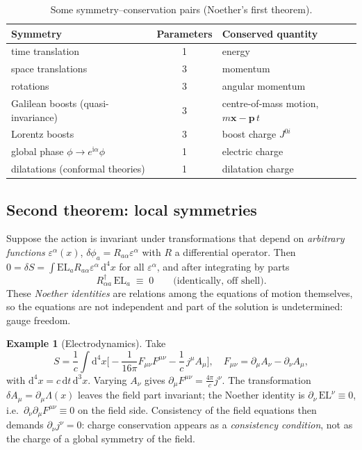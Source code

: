 \documentclass[11pt,a4paper,openany]{book}
\theoremstyle{definition}
\newtheorem{example}{Example}[chapter]
\theoremstyle{plain}
\theoremstyle{remark}
\newcommand{\dd}{\mathrm{d}}
\newcommand{\ii}{\mathrm{i}}
\newcommand{\eps}{\varepsilon}
\newcommand{\vx}{\bm{x}}
\newcommand{\vp}{\bm{p}}
\begin{document}
\begin{table}[ht]
\centering
\small
\renewcommand{\arraystretch}{1.2}
\begin{tabular}{@{}lcl@{}}
\toprule
Symmetry & Parameters & Conserved quantity\\
\midrule
time translation & 1 & energy\\
space translations & 3 & momentum\\
rotations & 3 & angular momentum\\
Galilean boosts (quasi-invariance) & 3 & centre-of-mass motion, $m\vx-\vp\,t$\\
Lorentz boosts & 3 & boost charge $J^{0i}$\\
global phase $\phi\to e^{\ii\alpha}\phi$ & 1 & electric charge\\
dilatations (conformal theories) & 1 & dilatation charge\\
\bottomrule
\end{tabular}
\caption{Some symmetry--conservation pairs (Noether's first theorem).}
\label{tab:noether}
\end{table}

\subsection{Second theorem: local symmetries}

Suppose the action is invariant under transformations that depend on
\emph{arbitrary functions} $\eps^\alpha(x)$,
$\delta\phi_a=R_{a\alpha}\eps^\alpha$ with $R$ a differential operator. Then
$0=\delta S=\int \mathrm{EL}_a R_{a\alpha}\eps^\alpha\,\dd^4x$ for all
$\eps^\alpha$, and after integrating by parts
\begin{equation}\label{eq:noether2}
  R^{\dagger}_{\alpha a}\,\mathrm{EL}_a\;\equiv\;0\qquad\text{(identically, off shell).}
\end{equation}
These \emph{Noether identities} are relations among the equations of motion
themselves, so the equations are not independent and part of the solution is
undetermined: gauge freedom.

\begin{example}[Electrodynamics]\label{ex:noether2-em}
Take
\begin{equation}\label{eq:maxwell-action}
  S=\frac1c\int \dd^4x\Big[-\frac{1}{16\pi}F_{\mu\nu}F^{\mu\nu}-\frac1c\,j^\mu A_\mu\Big],
  \quad F_{\mu\nu}=\partial_\mu A_\nu-\partial_\nu A_\mu,
\end{equation}
with $\dd^4x=c\,\dd t\,\dd^3x$. Varying $A_\nu$ gives
$\partial_\mu F^{\mu\nu}=\tfrac{4\pi}{c}j^\nu$. The transformation
$\delta A_\mu=\partial_\mu\Lambda(x)$ leaves the field part invariant; the
Noether identity is $\partial_\nu\,\mathrm{EL}^\nu\equiv0$, i.e.\
$\partial_\nu\partial_\mu F^{\mu\nu}\equiv0$ on the field side. Consistency of
the field equations then demands $\partial_\nu j^\nu=0$: charge conservation
appears as a \emph{consistency condition}, not as the charge of a
global symmetry of the field.
\end{example}
\end{document}
